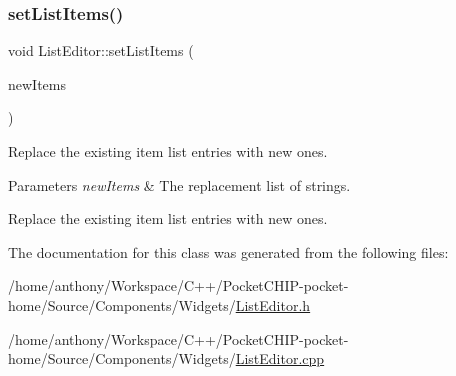 \subsubsection{\texorpdfstring{set\+List\+Items()}{setListItems()}}
{\footnotesize\ttfamily void List\+Editor\+::set\+List\+Items (\begin{DoxyParamCaption}\item[{String\+Array}]{new\+Items }\end{DoxyParamCaption})}

Replace the existing item list entries with new ones.


\begin{DoxyParams}{Parameters}
{\em new\+Items} & The replacement list of strings.\\
\hline
\end{DoxyParams}
Replace the existing item list entries with new ones. 

The documentation for this class was generated from the following files\+:\begin{DoxyCompactItemize}
\item 
/home/anthony/\+Workspace/\+C++/\+Pocket\+C\+H\+I\+P-\/pocket-\/home/\+Source/\+Components/\+Widgets/\mbox{\hyperlink{ListEditor_8h}{List\+Editor.\+h}}\item 
/home/anthony/\+Workspace/\+C++/\+Pocket\+C\+H\+I\+P-\/pocket-\/home/\+Source/\+Components/\+Widgets/\mbox{\hyperlink{ListEditor_8cpp}{List\+Editor.\+cpp}}\end{DoxyCompactItemize}
